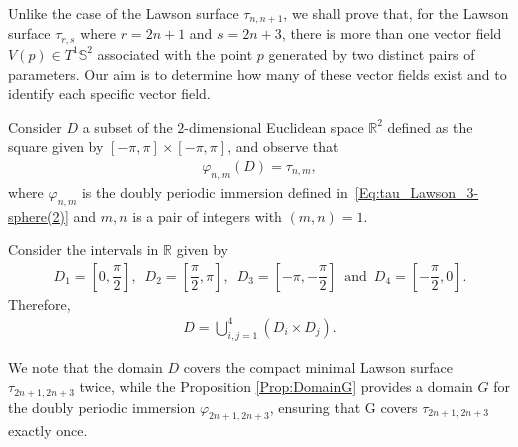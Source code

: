 \documentclass[reqno,11pt]{amsart}
\begin{document}
{Unlike the case of the Lawson surface $\tau_{n, n+1}$, we shall prove that, for the Lawson surface $\tau_{r,s}$ where $r=2n+1$ and $s=2n+3$, there is more than one vector field $V(p) \in T^1\mathbb{S}^2$ associated with the point $p$ generated by two distinct pairs of parameters. Our aim is to determine how many of these vector fields exist and to identify each specific vector field.


Consider $D$ a subset of the $2$-dimensional Euclidean space $\mathbb{R}^2$ defined as the square given by $[-\pi,\pi]\times[-\pi,\pi]$, and observe that
\begin{eqnarray*}
    \varphi_{n,m}(D) = \tau_{n,m},
\end{eqnarray*}
where $\varphi_{n,m}$ is the doubly periodic immersion defined in~\eqref{Eq:tau_Lawson_3-sphere(2)} and $m,n$ is a pair of integers with $(m,n)=1$.

\vspace{0.5cm}

\noindent 
Consider the intervals in $\mathbb{R}$ given by
\begin{eqnarray}\label{Eq:SubSquare}
D_1 = \left[0, \dfrac{\pi}{2}\right], \,\, \,D_2 = \left[\dfrac{\pi}{2}, \pi \right], \,\,\, D_3 = \left[-\pi , -\dfrac{\pi}{2}\right]\,\,\, \mbox{and} \,\,\, D_4 = \left[-\dfrac{\pi}{2}, 0\right].    
\end{eqnarray}
Therefore,
\begin{eqnarray}\label{Eq:Square}
    D = \bigcup_{i,j=1}^4 (D_i\times D_j).
\end{eqnarray}

\noindent 
We note that the domain $D$ covers the compact minimal Lawson surface $\tau_{2n+1,2n+3}$ twice, while the Proposition \ref{Prop:DomainG} provides a domain $G$ for the doubly periodic immersion $\varphi_{2n+1,2n+3}$, ensuring that G covers $\tau_{2n+1,2n+3}$ exactly once.



}
\end{document}
